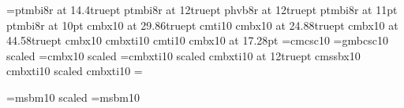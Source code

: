 \font\secfontmathit=ptmbi8r at 14.4truept
\font\idxfont ptmbi8r at 12truept
\font\awfont phvb8r at 12truept
\font\exerciseheadfont ptmbi8r at 11pt
\let\institutionfont\exerciseheadfont
\font{} ptmbi8r at 10pt
\else
\font\booktitlefont cmbx10 at 29.86truept
\font\booksubtitlefont cmti10
\font\chaptitlefont cmbx10 at 24.88truept
\font\chapnumberfont cmbx10 at 44.58truept
\font\pagenofont cmbx10
\font\prooffont cmbxti10
\font\remarksfont cmti10
\font\ctscnfont cmbx10 at 17.28pt
\let\authorfont\ctscnfont
\font\scfont=cmcsc10
\font\bscfont=gmbcsc10 scaled 
\font\secfontmathrm=cmbx10 scaled 
\font\secfontmathit=cmbxti10 scaled 
\font\idxfont cmbxti10 at 12truept
\font\awfont cmssbx10
\font\exerciseheadfont cmbxti10 scaled \magstephalf
\let\institutionfont\exerciseheadfont
\font{} cmbxti10 
\fi
%
\newfam\smcap \def\sc{\fam\smcap\scfont} \textfont\smcap=\scfont
%
\long\def\setupamsfonts{\csname newif\endcsname\ifamsfonts\amsfontstrue}
\ifx\ifamsfonts\undefined\let\next\setupamsfonts
\else\let\next\relax\fi\next
\long\def\setupbbbold{\csname newfam\endcsname\bbbfam}
\ifamsfonts\ifx\bbbfam\undefined\let\next\setupbbbold\else
\let\next\relax\fi\else\let\next\relax\fi\next

\ifamsfonts
\font\fourteenbbbold=msbm10 scaled 
\font\fourteensubbbbold=msbm10
\fi
\def\secfont{\def\rm{\fam0\bscfont}%
  \textfont0=\secfontmathrm \scriptfont0=\tenrm \scriptscriptfont0=\sevenrm
  \textfont1=\secfontmathit \scriptfont1=\tenit \scriptscriptfont1=\sevenit
  \textfont2=\tensy \scriptfont2=\tensy \scriptscriptfont2=\sevensy
  \textfont3=\tenex \scriptfont3=\tenex \scriptscriptfont3=\sevenex
  \ifamsfonts
  \textfont\bbbfam\fourteenbbbold \scriptfont\bbbfam\fourteensubbbbold
  \def\bbbold{\fam\bbbfam\fourteenbbbold}\fi%
  \normalbaselineskip=18pt%
  \setbox\strutbox=\hbox{\vrule height12.5pt depth5.5pt width0pt}%
  \normalbaselines\rm}

